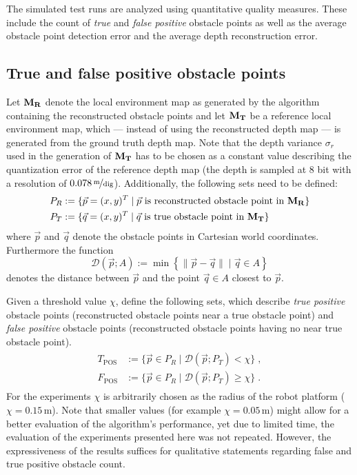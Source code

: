 The simulated test runs are analyzed using quantitative quality measures. These include the count of \textit{true} and \textit{false positive} obstacle points as well as the average obstacle point detection error and the average depth reconstruction error.

\subsection{True and false positive obstacle points}
Let $\mathbf{M_R}$ denote the local environment map as generated by the algorithm containing the reconstructed obstacle points and let $\mathbf{M_T}$ be a reference local environment map, which --- instead of using the reconstructed depth map --- is generated from the ground truth depth map. Note that the depth variance $\sigma_r$ used in the generation of $\mathbf{M_T}$ has to be chosen as a constant value describing the quantization error of the reference depth map (the depth is sampled at 8 bit with a resolution of $0.078 \, \nicefrac{\mathrm{m}}{\mathrm{dig}}$). Additionally, the following sets need to be defined:
\begin{align*}
  P_R &:= \{ \vec p = (x, y)^T \mid \vec p \text{ is reconstructed obstacle point in } \img{M_R}\} \\
  P_T &:=  \{ \vec q = (x, y)^T \mid \vec q \text{ is true obstacle point in } \img{M_T}\}
\end{align*}
where $\vec p$ and $\vec q$ denote the obstacle points in Cartesian world coordinates. Furthermore the function
\begin{equation}
  \mathcal{D}(\vec p; A) := \min \left\{\| \vec p - \vec q \| \mid \vec q \in A \right\}
\end{equation}
denotes the distance between $\vec p$ and the point $\vec q \in A$ closest to $\vec p$.

Given a threshold value $\chi$, define the following sets, which describe \textit{true positive} obstacle points (reconstructed obstacle points near a true obstacle point) and \textit{false positive} obstacle points (reconstructed obstacle points having no near true obstacle point).
\begin{align}
\begin{aligned}
  T_{\mathrm{POS}} &:= \{\vec p \in P_R \mid \mathcal{D}(\vec p; P_T) < \chi\} \; ,\\
  F_{\mathrm{POS}} &:= \{\vec p \in P_R \mid \mathcal{D}(\vec p; P_T) \geq \chi\} \; .
\end{aligned}
\end{align}
For the experiments $\chi$ is arbitrarily chosen as the radius of the robot platform ($\chi = 0.15\,\mathrm{m}$). Note that smaller values (for example $\chi = 0.05\,\mathrm{m}$) might allow for a better evaluation of the algorithm's performance, yet due to limited time, the evaluation of the experiments presented here was not repeated. However, the expressiveness of the results suffices for qualitative statements regarding false and true positive obstacle count.

